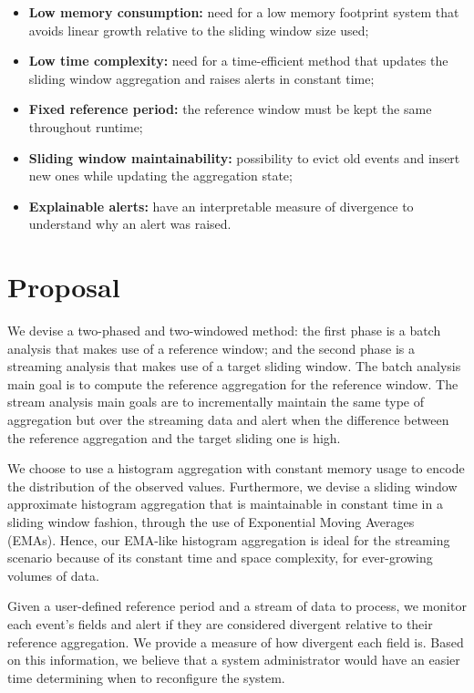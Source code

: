 \begin{itemize}
    \item \textbf{Low memory consumption:} need for a low memory footprint system that avoids linear growth relative to the sliding window size used;
    
    \item \textbf{Low time complexity:} need for a time-efficient method that updates the sliding window aggregation and raises alerts in constant time;
    
    \item \textbf{Fixed reference period:} the reference window must be kept the same throughout runtime;
    
    \item \textbf{Sliding window maintainability:} possibility to evict old events and insert new ones while updating the aggregation state;
    
    \item \textbf{Explainable alerts:} have an interpretable measure of divergence to understand why an alert was raised.
\end{itemize}


\section{Proposal} \label{sec:proposal}
We devise a two-phased and two-windowed method: the first phase is a batch analysis that makes use of a reference window; and the second phase is a streaming analysis that makes use of a target sliding window. The batch analysis main goal is to compute the reference aggregation for the reference window. The stream analysis main goals are to incrementally maintain the same type of aggregation but over the streaming data and alert when the difference between the reference aggregation and the target sliding one is high.

We choose to use a histogram aggregation with constant memory usage to encode the distribution of the observed values. Furthermore, we devise a sliding window approximate histogram aggregation that is maintainable in constant time in a sliding window fashion, through the use of Exponential Moving Averages (EMAs). Hence, our EMA-like histogram aggregation is ideal for the streaming scenario because of its constant time and space complexity, for ever-growing volumes of data.

Given a user-defined reference period and a stream of data to process, we monitor each event's fields and alert if they are considered divergent relative to their reference aggregation. We provide a measure of how divergent each field is. Based on this information, we believe that a system administrator would have an easier time determining when to reconfigure the system.

